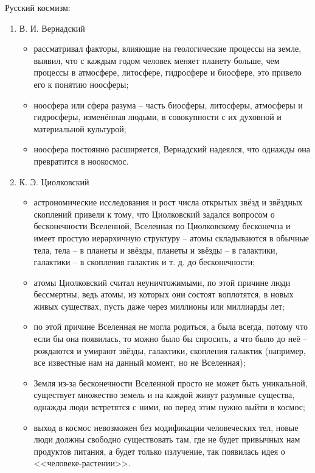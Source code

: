 Русский космизм:
\begin{enumerate}
	\item В. И. Вернадский 
	\begin{itemize}
		\item рассматривал факторы, влияющие на геологические процессы на земле, выявил, что с каждым годом человек меняет планету больше, чем процессы в атмосфере, литосфере, гидросфере и биосфере, это привело его к понятию ноосферы;
		\item ноосфера или сфера разума -- часть биосферы, литосферы, атмосферы и гидросферы, изменённая людьми, в совокупности с их духовной и материальной культурой;
		\item ноосфера постоянно расширяется, Вернадский надеялся, что однажды она превратится в ноокосмос.
	\end{itemize}
	\item К. Э. Циолковский
	\begin{itemize}
		\item астрономические исследования и рост числа открытых звёзд и звёздных скоплений привели к тому, что Циолковский задался вопросом о бесконечности Вселенной, Вселенная по Циолковскому бесконечна и имеет простую иерархичную структуру -- атомы складываются в обычные тела, тела -- в планеты и звёзды, планеты и звёзды -- в галактики, галактики -- в скопления галактик и т. д. до бесконечности;
		\item атомы Циолковский считал неуничтожимыми, по этой причине люди бессмертны, ведь атомы, из которых они состоят воплотятся, в новых живых существах, пусть даже через миллионы или миллиарды лет;
		\item по этой причине Вселенная не могла родиться, а была всегда, потому что если бы она появилась, то можно было бы спросить, а что было до неё -- рождаются и умирают звёзды, галактики, скопления галактик (например, все известные нам на данный момент, но не Вселенная);
		\item Земля из-за бесконечности Вселенной просто не может быть уникальной, существует множество земель и на каждой живут разумные существа, однажды люди встретятся с ними, но перед этим нужно выйти в космос;
		\item выход в космос невозможен без модификации человеческих тел, новые люди должны свободно существовать там, где не будет привычных нам продуктов питания, а будет только излучение, так появилась идея о <<человеке-растении>>.
	\end{itemize}
\end{enumerate}
